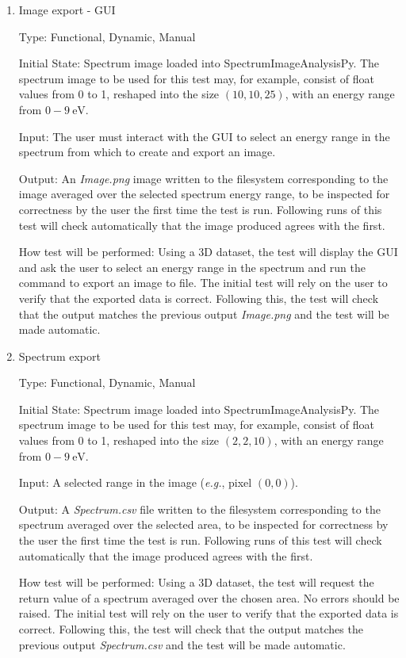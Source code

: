\documentclass[12pt, titlepage]{article}
\newcommand{\progname}{SpectrumImageAnalysisPy}
\begin{document}
\begin{enumerate}
\item{Image export - GUI}
\label{TFR:ImgExportGUI}

Type: Functional, Dynamic, Manual

Initial State: Spectrum image loaded into \progname{}. The spectrum image to be
used for this test may, for example, consist of float values from 0 to 1,
reshaped into the size $(10,10,25)$, with an energy range from $0-9\
\si{\electronvolt}$.

Input: The user must interact with the GUI to select an energy range in the
spectrum from which to create and export an image.

Output: An \textit{Image.png} image written to the filesystem corresponding to
the image averaged over the selected spectrum energy range, to be inspected for
correctness by the user the first time the test is run. Following runs of this
test will check automatically that the image produced agrees with the first.

How test will be performed: Using a 3D dataset, the test will display the GUI
and ask the user to select an energy range in the spectrum and run the command
to export an image to file.  The initial test will rely on the user to verify
that the exported data is correct. Following this, the test will check that the
output matches the previous output \textit{Image.png} and the test will be made
automatic.\\

\item{Spectrum export}
\label{TFR:SpecExport}

Type: Functional, Dynamic, Manual

Initial State: Spectrum image loaded into \progname{}. The spectrum image to be
used for this test may, for example, consist of float values from 0 to 1,
reshaped into the size $(2,2,10)$, with an energy range from $0-9\
\si{\electronvolt}$.

Input: A selected range in the image (\textit{e.g.}, pixel $(0,0)$).

Output: A \textit{Spectrum.csv} file written to the filesystem corresponding to
the spectrum averaged over the selected area, to be inspected for correctness by
the user the first time the test is run. Following runs of this test will check
automatically that the image produced agrees with the first.

How test will be performed: Using a 3D dataset, the test will request the return
value of a spectrum averaged over the chosen area. No errors should be raised.
The initial test will rely on the user to verify that the exported data is
correct. Following this, the test will check that the output matches the
previous output \textit{Spectrum.csv} and the test will be made automatic.\\


\end{enumerate}
\end{document}
